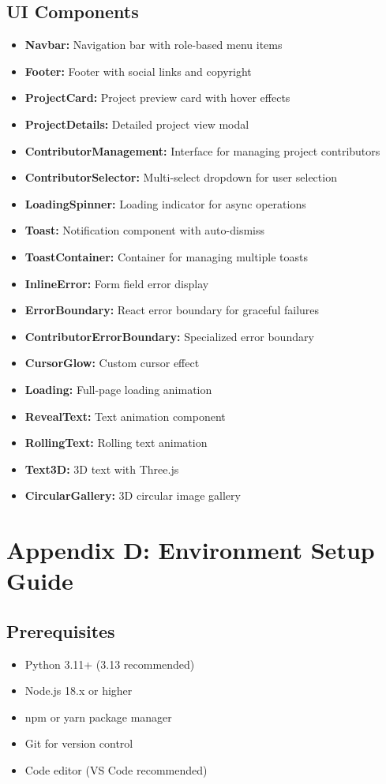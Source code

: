 \documentclass[11pt,a4paper]{article}
\begin{document}
\subsection{UI Components}
\begin{itemize}[leftmargin=*]
    \item \textbf{Navbar:} Navigation bar with role-based menu items
    \item \textbf{Footer:} Footer with social links and copyright
    \item \textbf{ProjectCard:} Project preview card with hover effects
    \item \textbf{ProjectDetails:} Detailed project view modal
    \item \textbf{ContributorManagement:} Interface for managing project contributors
    \item \textbf{ContributorSelector:} Multi-select dropdown for user selection
    \item \textbf{LoadingSpinner:} Loading indicator for async operations
    \item \textbf{Toast:} Notification component with auto-dismiss
    \item \textbf{ToastContainer:} Container for managing multiple toasts
    \item \textbf{InlineError:} Form field error display
    \item \textbf{ErrorBoundary:} React error boundary for graceful failures
    \item \textbf{ContributorErrorBoundary:} Specialized error boundary
    \item \textbf{CursorGlow:} Custom cursor effect
    \item \textbf{Loading:} Full-page loading animation
    \item \textbf{RevealText:} Text animation component
    \item \textbf{RollingText:} Rolling text animation
    \item \textbf{Text3D:} 3D text with Three.js
    \item \textbf{CircularGallery:} 3D circular image gallery
\end{itemize}

\section{Appendix D: Environment Setup Guide}

\subsection{Prerequisites}
\begin{itemize}[leftmargin=*]
    \item Python 3.11+ (3.13 recommended)
    \item Node.js 18.x or higher
    \item npm or yarn package manager
    \item Git for version control
    \item Code editor (VS Code recommended)
\end{itemize}
\end{document}
